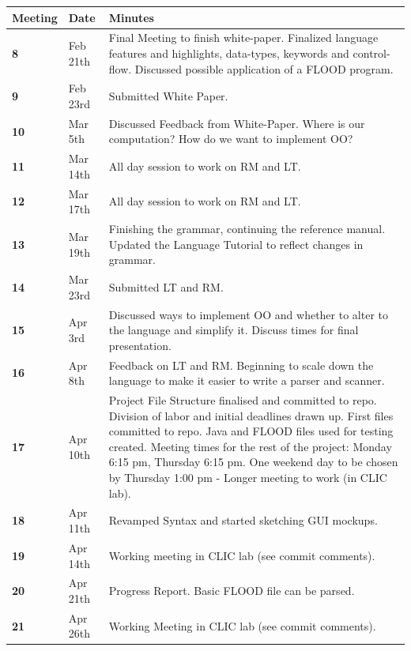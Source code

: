 \documentclass[12pt]{report}
\begin{document}
\begin{flushleft}
\begin{singlespace}
\begin{tabular}{ | p{2cm} | p{1.8cm} | p{12cm} | }
\hline
\textbf{Meeting} & \textbf{Date} & \textbf{Minutes}\\
\hline
\textbf{8} & Feb 21th & Final Meeting to finish white-paper. Finalized language features and highlights, data-types, keywords and control-flow. Discussed possible application of a FLOOD program.\\
\hline
\textbf{9} & Feb 23rd & Submitted White Paper.\\
\hline
\textbf{10} & Mar 5th & Discussed Feedback from White-Paper. Where is our computation? How do we want to implement OO?\\
\hline
\textbf{11} & Mar 14th & All day session to work on RM and LT.\\
\hline
\textbf{12} & Mar 17th & All day session to work on RM and LT.\\
\hline
\textbf{13} & Mar 19th & Finishing the grammar, continuing the reference manual. Updated the Language Tutorial to reflect changes in grammar.\\
\hline
\textbf{14} & Mar 23rd & Submitted LT and RM.\\
\hline
\textbf{15} & Apr 3rd & Discussed ways to implement OO and whether to alter to the language and simplify it. Discuss times for final presentation.\\
\hline
\textbf{16} & Apr 8th & Feedback on LT and RM. Beginning to scale down the language to make it easier to write a parser and scanner.\\
\hline
\textbf{17} & Apr 10th & Project File Structure finalised and committed to repo. Division of labor and initial deadlines drawn up. First files committed to repo. Java and FLOOD files used for testing created. Meeting times for the rest of the project: Monday 6:15 pm, Thursday 6:15 pm. One weekend day to be chosen by Thursday 1:00 pm - Longer meeting to work (in CLIC lab).\\
\hline
\textbf{18} & Apr 11th & Revamped Syntax and started sketching GUI mockups.\\
\hline
\textbf{19} & Apr 14th & Working meeting in CLIC lab (see commit comments).\\
\hline
\textbf{20} & Apr 21th & Progress Report. Basic FLOOD file can be parsed.\\
\hline
\textbf{21} & Apr 26th & Working Meeting in CLIC lab (see commit comments).\\

\end{tabular}
\end{singlespace}
\end{flushleft}
\end{document}

